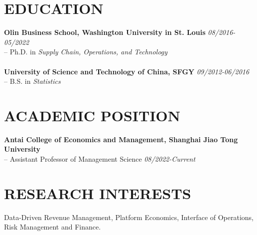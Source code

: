 \documentclass[margin]{res} %
\begin{document}
\begin{resume}

%    



    \section{\textbf{EDUCATION}}
    {\bf Olin Business School, Washington University in St. Louis} \hfill {\em 08/2016-05/2022} \\ 
    -- Ph.D. in {\it Supply Chain, Operations, and Technology} \\
    ~
    \\
    {\bf University of Science and Technology of China, SFGY} \hfill {\em 09/2012-06/2016} \\ 
    -- B.S. in {\it Statistics}\\


    \section{\textbf{ACADEMIC POSITION}}
    {\bf Antai College of Economics and Management, Shanghai Jiao Tong University} \\ 
    -- Assistant Professor of Management Science \hfill {\em 08/2022-Current}\\

    \section{RESEARCH INTERESTS} 
    Data-Driven Revenue Management, Platform Economics, Interface of Operations, Risk Management and Finance.


\end{resume}
\end{document}
